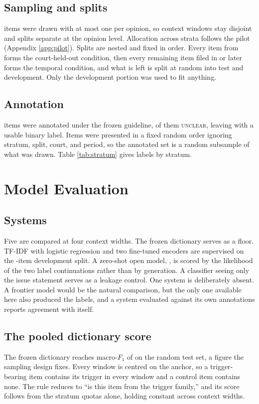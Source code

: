 

\subsection{Sampling and splits} \NDrawn{} items were drawn with at most one per
opinion, so context windows stay disjoint and splits separate at the opinion
level. Allocation across strata follows the pilot (Appendix \ref{app:pilot}).
Splits are nested and fixed in order. Every item from \HeldOutCourts{}
forms the court-held-out condition, then every remaining item filed in \TemporalCut{} or
later forms the temporal condition, and what is left is split at random into test
and development. Only the development portion was used to fit anything.

\subsection{Annotation} \NAnnotated{} items were annotated under the frozen guideline, \NUnclear{}
of them \textsc{unclear}, leaving \NBench{} with a usable binary label. Items were
presented in a fixed random order ignoring stratum, split, court, and period, so
the annotated set is a random subsample of what was drawn. Table
\ref{tab:stratum} gives labels by stratum.

\section{Model Evaluation}
\label{sec:models}



\subsection{Systems} Five are compared at four context widths. The frozen
dictionary serves as a floor. TF-IDF with logistic regression and two fine-tuned
encoders are supervised on the \NDev{}-item development split. A zero-shot open
model, \LLMName{}, is scored by the likelihood of the two label
continuations rather than by generation. A classifier seeing only the issue
statement serves as a leakage control. One system is deliberately absent. A
frontier model would be the natural comparison, but the only one available here
also produced the labels, and a system evaluated against its own annotations
reports agreement with itself.

\subsection{The pooled dictionary score} The frozen dictionary reaches
macro-$F_1$ of \LexF{} on the random test set, a figure the sampling design fixes.
Every window is centred on the anchor, so a trigger-bearing item contains its
trigger in every window and a control item contains none. The rule reduces to
``is this item from the trigger family,'' and its score follows from the stratum
quotas alone, holding constant across context widths.

